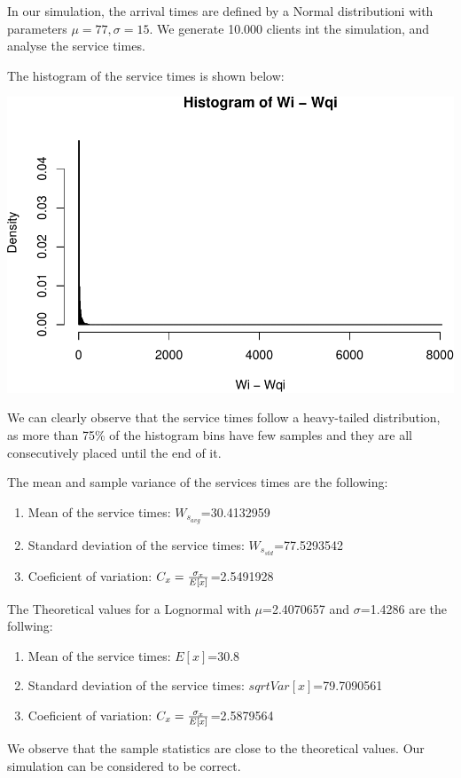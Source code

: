 \documentclass[]{article}
\providecommand{\tightlist}{%
  \setlength{\itemsep}{0pt}\setlength{\parskip}{0pt}}
\begin{document}
In our simulation, the arrival times are defined by a Normal
distributioni with parameters \(\mu=77, \sigma=15\). We generate 10.000
clients int the simulation, and analyse the service times.

The histogram of the service times is shown below:

\begin{center}\includegraphics[width=0.5\linewidth]{003_files/figure-latex/unnamed-chunk-6-1} \end{center}

We can clearly observe that the service times follow a heavy-tailed
distribution, as more than 75\% of the histogram bins have few samples
and they are all consecutively placed until the end of it.

The mean and sample variance of the services times are the following:

\begin{enumerate}
\def\labelenumi{\arabic{enumi}.}
\tightlist
\item
  Mean of the service times: \(W_{s_{avg}}\)=30.4132959
\item
  Standard deviation of the service times: \(W_{s_{std}}\)=77.5293542
\item
  Coeficient of variation: \(C_{x}={ \sigma_{x} \over E[x] }\)=2.5491928
\end{enumerate}

The Theoretical values for a Lognormal with \(\mu\)=2.4070657 and
\(\sigma\)=1.4286 are the follwing:

\begin{enumerate}
\def\labelenumi{\arabic{enumi}.}
\tightlist
\item
  Mean of the service times: \(E[x]\)=30.8
\item
  Standard deviation of the service times: \(sqrt{Var[x]}\)=79.7090561
\item
  Coeficient of variation: \(C_{x}={ \sigma_{x} \over E[x] }\)=2.5879564
\end{enumerate}

We observe that the sample statistics are close to the theoretical
values. Our simulation can be considered to be correct.
\end{document}
